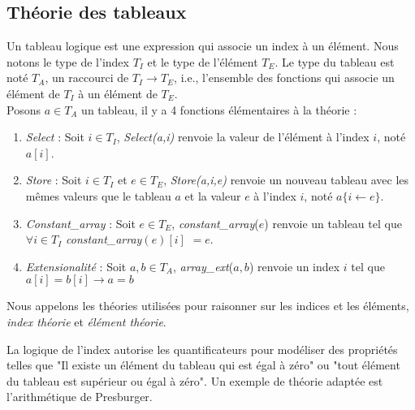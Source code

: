 \documentclass[9pt,openany]{book}
\begin{document}
		
		
		
		
		
	\subsection{Th\'eorie des tableaux}	
	Un tableau logique est une expression qui associe un index \`a un \'el\'ement. Nous notons le type de l'index $T_{I}$ et le type de l'\'el\'ement $T_{E}$. Le type du tableau est not\'e $T_{A}$, un raccourci de $T_{I}\rightarrow T_{E}$, i.e., l'ensemble des fonctions qui associe un \'el\'ement de $T_{I}$ \`a un \'el\'ement de $T_{E}$.\\
	Posons $a\in T_{A}$ un tableau, il y a 4 fonctions \'el\'ementaires \`a la th\'eorie :
	\begin{enumerate}
	\item \textit{Select} : Soit $i\in T_{I}$, \textit{Select(a,i)} renvoie la valeur de l'\'el\'ement \`a l'index $i$, not\'e $a[i]$.
	\item \textit{Store} :  Soit $i\in T_{I}$ et $e\in T_{E}$, \textit{Store(a,i,e)} renvoie un nouveau tableau avec les m\^emes valeurs que le tableau $a$ et la valeur $e$ \`a l'index $i$, not\'e $a\{i\leftarrow e\}$.
	\item \textit{Constant_array} : Soit $e\in T_{E}$, \textit{constant\_array}($e$) renvoie un tableau tel que $\forall i\in T_{I}$  \textit{constant\_array}$(e)[i]$ $= e$.
	\item \textit{Extensionalit\'e} : Soit $a,b\in T_{A}$, \textit{array_ext}($a,b$) renvoie un index $i$ tel que $a[i] = b[i]\rightarrow a = b $
	\end{enumerate}
	Nous appelons les th\'eories utilis\'ees pour raisonner sur les indices et les \'el\'ements, \textit{index th\'eorie} et \textit{\'el\'ement th\'eorie}.\par
La logique de l'index autorise les quantificateurs pour mod\'eliser des propri\'et\'es telles que "Il existe un \'el\'ement du tableau qui est \'egal \`a z\'ero" ou "tout \'el\'ement du tableau est sup\'erieur ou \'egal \`a z\'ero". Un exemple de th\'eorie adapt\'ee est l'arithm\'etique de Presburger.
	
\end{document}
